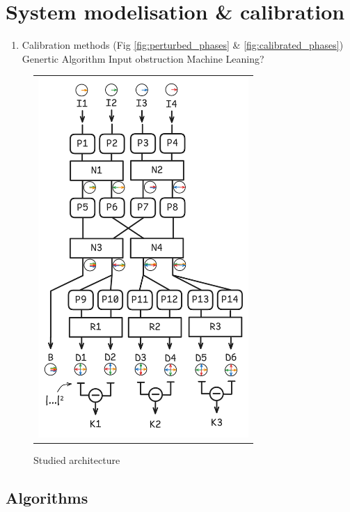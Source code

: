 \documentclass{aa}
\begin{document}
\section{System modelisation \& calibration}
    \begin{enumerate}
        \item Calibration methods (Fig \ref{fig:perturbed_phases} \& \ref{fig:calibrated_phases})
        \subitem Genertic Algorithm
        \subitem Input obstruction
        \subitem Machine Leaning?
    \end{enumerate}

    \begin{figure}[H]
        \begin{center}
        \begin{tabular}{c}
        \includegraphics[width=8cm]{img/kernel_scheme.png}
        \end{tabular}
        \end{center}
        \caption[architecture] 
        { \label{fig:architecture} 
        Studied architecture}
    \end{figure}

    \subsection{Algorithms}
\end{document}
